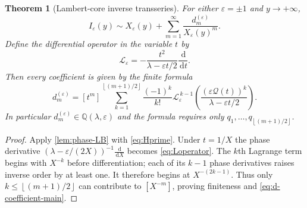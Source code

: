 \documentclass[11pt]{article}
\newtheorem{theorem}{Theorem}[section]
\theoremstyle{definition}
\theoremstyle{remark}
\newcommand{\eps}{\varepsilon}
\newcommand{\lam}{\lambda}
\newcommand{\dd}{\,\mathrm d}
\newcommand{\Qf}{\mathcal Q}
\newcommand{\floor}[1]{\left\lfloor #1\right\rfloor}
\begin{document}
\begin{theorem}[Lambert-core inverse transseries]\label{thm:inverse-X}
For either $\eps=\pm1$ and $y\to+\infty$,
\begin{equation}\label{eq:I-X-series}
 I_\eps(y)\sim X_\eps(y)+\sum_{m=1}^\infty
 \frac{d_m^{(\eps)}}{X_\eps(y)^m}.
\end{equation}
Define the differential operator in the variable $t$ by
\begin{equation}\label{eq:Loperator}
 \mathcal L_\eps=-\frac{t^2}{\lam-\eps t/2}\frac{\dd}{\dd t}.
\end{equation}
Then every coefficient is given by the finite formula
\begin{equation}\label{eq:d-coefficient-main}
 d_m^{(\eps)}=
 [t^m]\sum_{k=1}^{\floor{(m+1)/2}}\frac{(-1)^k}{k!}
 \mathcal L_\eps^{\,k-1}
 \left(\frac{(\eps\Qf(t))^k}{\lam-\eps t/2}\right).
\end{equation}
In particular $d_m^{(\eps)}\in\mathbb Q(\lam,\eps)$ and the formula requires only $q_1,\ldots,q_{\floor{(m+1)/2}}$.
\end{theorem}

\begin{proof}
Apply \cref{lem:phase-LB} with \eqref{eq:Hprime}.  Under $t=1/X$ the phase derivative
$(\lam-\eps/(2X))^{-1}\frac{\dd}{\dd X}$ becomes \eqref{eq:Loperator}.  The $k$th Lagrange term begins with $X^{-k}$ before differentiation; each of its $k-1$ phase derivatives raises inverse order by at least one.  It therefore begins at $X^{-(2k-1)}$.  Thus only $k\le\floor{(m+1)/2}$ can contribute to $[X^{-m}]$, proving finiteness and \eqref{eq:d-coefficient-main}.
\end{proof}
\end{document}
